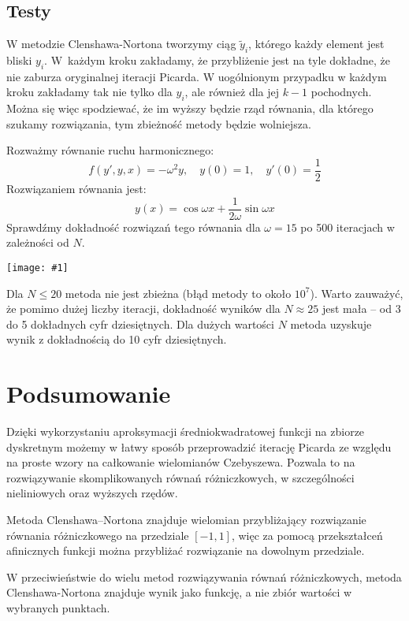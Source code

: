 \documentclass{article}
\newcommand{\plot}[1] {
	\texttt{[image: \#1]}
}
\begin{document}
\subsection{Testy}
	W metodzie Clenshawa-Nortona tworzymy ciąg ${\widetilde{y}_i}$, którego każdy element jest bliski $y_i$. W~każdym kroku zakładamy, że przybliżenie jest na tyle dokładne, że nie zaburza oryginalnej iteracji Picarda. W uogólnionym przypadku w każdym kroku zakładamy tak nie tylko dla $y_i$, ale również dla jej $k-1$ pochodnych. Można się więc spodziewać, że im wyższy będzie rząd równania, dla którego szukamy rozwiązania, tym zbieżność metody będzie  wolniejsza.
	
\par Rozważmy równanie ruchu harmonicznego:
	$$f(y', y, x) = - \omega^2 y, \quad y(0) = 1, \quad y'(0)=\frac{1}{2} $$
	Rozwiązaniem równania jest:
	$$ y(x) = \cos{\omega x} + \frac{1}{2\omega} \sin{\omega x} $$
	Sprawdźmy dokładność rozwiązań tego równania dla $\omega = 15 $ po 500 iteracjach w zależności od $N$.

\plot{harmonic.png}
	Dla $N \le 20 $ metoda nie jest zbieżna (błąd metody to około $10^7$).
	Warto zauważyć, że pomimo dużej liczby iteracji, dokładność wyników dla $ N \approx 25$ jest mała -- od 3 do 5 dokładnych cyfr dziesiętnych.
	Dla dużych wartości $N$ metoda uzyskuje wynik z dokładnością do 10 cyfr dziesiętnych.
	
\section{Podsumowanie}

\par Dzięki wykorzystaniu aproksymacji średniokwadratowej funkcji na zbiorze dyskretnym możemy w łatwy sposób przeprowadzić iterację Picarda ze względu na proste wzory na całkowanie wielomianów Czebyszewa. Pozwala to na rozwiązywanie skomplikowanych równań różniczkowych, w szczególności nieliniowych oraz wyższych rzędów. 

\par Metoda Clenshawa--Nortona znajduje wielomian przybliżający rozwiązanie równania różniczkowego na przedziale $[ -1, 1 ]$, więc za pomocą przekształceń afinicznych funkcji można przybliżać rozwiązanie na dowolnym przedziale. 

\par W przeciwieństwie do wielu metod rozwiązywania równań różniczkowych, metoda Clenshawa-Nortona znajduje wynik jako funkcję, a nie zbiór wartości w wybranych punktach. 
\end{document}
